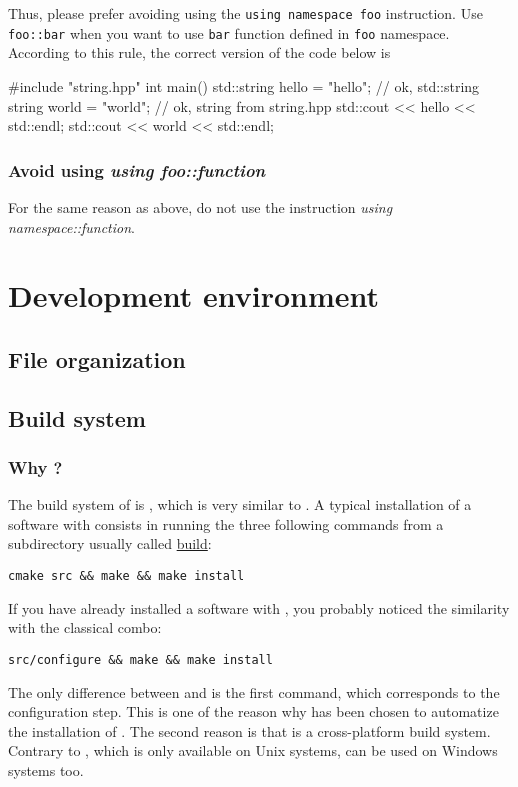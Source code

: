 Thus, please prefer avoiding using the \texttt{using namespace foo} instruction. Use \texttt{foo::bar} when you want to use \texttt{bar} function defined in \texttt{foo} namespace. According to this rule, the correct version of the code below is
\begin{cppcode}
	#include "string.hpp"
	int main()
	{
		std::string hello = "hello"; // ok, std::string
		string world = "world"; // ok, string from string.hpp
		std::cout << hello << std::endl;
		std::cout << world << std::endl;
	}
\end{cppcode}

\subsection{Avoid using \textit{using foo::function}} 

For the same reason as above, do not use the instruction \textit{using namespace::function}.




\chapter{Development environment}

\section{File organization}
\section{Build system}

\subsection{Why \CMake?}

The build system of \Simol is \CMake, which is very similar to \Make. A typical installation of a software with \CMake consists in running the three following commands from a subdirectory usually called \url{build}: 
\lstset{language=bash} 
\begin{lstlisting}
cmake src && make && make install
\end{lstlisting}
If you have already installed a software with \Make, you probably noticed the similarity with the classical combo:
\lstset{language=bash} 
\begin{lstlisting}
src/configure && make && make install
\end{lstlisting}
The only difference between \Make and \CMake is the first command, which corresponds to the configuration step. This is one of the reason why \CMake has been chosen to automatize the installation of \Simol. The second reason is that \CMake is a cross-platform build system. Contrary to \Make, which is only available on Unix systems, \CMake can be used on Windows systems too.

